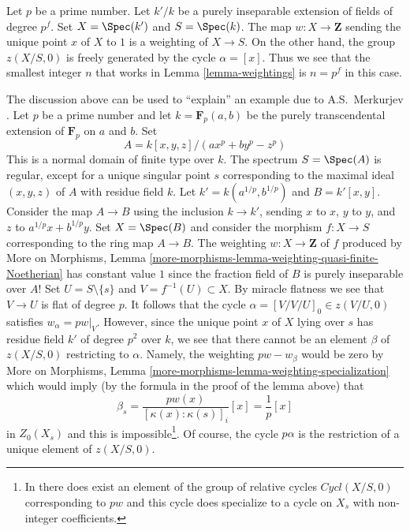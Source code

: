 \begin{example}
\label{example-n-must-be-positive-sometimes}
Let $p$ be a prime number. Let $k'/k$ be a purely inseparable extension
of fields of degree $p^f$. Set $X = \Spec(k')$ and $S = \Spec(k)$.
The map $w : X \to \mathbf{Z}$ sending the unique point $x$ of $X$ to $1$
is a weighting of $X \to S$. On the other hand,
the group $z(X/S, 0)$ is freely generated by the cycle $\alpha = [x]$.
Thus we see that the smallest integer $n$ that works in
Lemma \ref{lemma-weightings} is $n = p^f$ in this case.
\end{example}

\begin{example}
\label{example-Merkurjev}
The discussion above can be used to ``explain'' an example due to
A.S.~Merkurjev \cite[Example 3.5.10]{SV}. Let $p$ be a prime number
and let $k = \mathbf{F}_p(a, b)$ be the purely transcendental extension
of $\mathbf{F}_p$ on $a$ and $b$. Set
$$
A = k[x, y, z]/(a x^p + b y^p - z^p)
$$
This is a normal domain of finite type over $k$. The spectrum
$S = \Spec(A)$ is regular, except for a unique singular point $s$
corresponding to the maximal ideal $(x, y, z)$ of $A$ with residue field $k$.
Let $k' = k(a^{1/p}, b^{1/p})$ and $B = k'[x, y]$. Consider the map
$A \to B$ using the inclusion $k \to k'$, sending $x$ to $x$, $y$ to $y$,
and $z$ to $a^{1/p}x + b^{1/p}y$. Set $X = \Spec(B)$ and consider the morphism
$f : X \to S$ corresponding to the ring map $A \to B$.
The weighting $w : X \to \mathbf{Z}$ of $f$
produced by More on Morphisms, Lemma
\ref{more-morphisms-lemma-weighting-quasi-finite-Noetherian}
has constant value $1$ since the fraction field of $B$ is purely inseparable
over $A$!
Set $U = S \setminus \{s\}$ and $V = f^{-1}(U) \subset X$.
By miracle flatness we see that
$V \to U$ is flat of degree $p$. It follows that the cycle
$\alpha = [V/V/U]_0 \in z(V/U, 0)$ satisfies $w_\alpha = pw|_V$.
However, since the unique point $x$ of $X$ lying over $s$
has residue field $k'$ of degree $p^2$ over $k$, we see that
there cannot be an element $\beta$ of $z(X/S, 0)$ restricting to $\alpha$.
Namely, the weighting $pw - w_\beta$ would be zero by More on Morphisms,
Lemma \ref{more-morphisms-lemma-weighting-specialization} which
would imply (by the formula in the proof of the lemma above) that
$$
\beta_s = \frac{pw(x)}{[\kappa(x) : \kappa(s)]_i} [x] =
\frac{1}{p}[x]
$$
in $Z_0(X_s)$ and this is impossible\footnote{In \cite{SV} there does
exist an element of the group of relative cycles $Cycl(X/S, 0)$
corresponding to $pw$ and this cycle does specialize to a cycle
on $X_s$ with non-integer coefficients.}. Of course, 
the cycle $p\alpha$ is the restriction of a unique element of
$z(X/S, 0)$.
\end{example}









